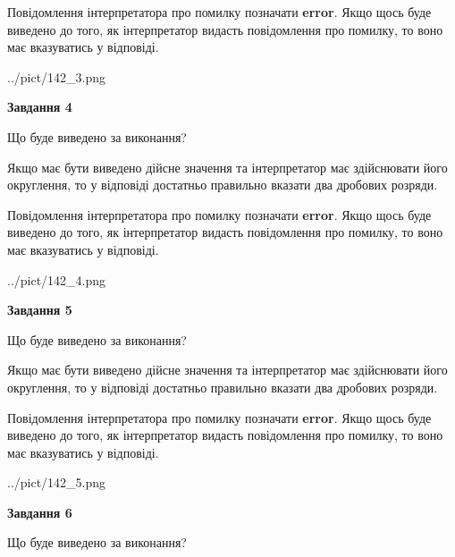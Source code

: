\documentclass[12pt, ukrainian]{article}
\begin{document}
{\begin {Large}
Повідомлення інтерпретатора про помилку позначати \textbf{error}.
Якщо щось буде виведено до того, як інтерпретатор видасть повідомлення про помилку, 
то воно має вказуватись у відповіді. \par

\begin{center}
	{../pict/142_3.png}
\end{center}
\newpage

{\begin {center}\textbf{Завдання 4}\end {center}}\par
Що буде виведено за виконання? \par

Якщо має бути виведено дійсне значення та інтерпретатор має здійснювати його округлення, 
то у відповіді достатньо правильно вказати два дробових розряди.

Повідомлення інтерпретатора про помилку позначати \textbf{error}.
Якщо щось буде виведено до того, як інтерпретатор видасть повідомлення про помилку, 
то воно має вказуватись у відповіді. \par

\begin{center}
	{../pict/142_4.png}
\end{center}
\newpage

{\begin {center}\textbf{Завдання 5}\end {center}}\par
Що буде виведено за виконання? \par

Якщо має бути виведено дійсне значення та інтерпретатор має здійснювати його округлення, 
то у відповіді достатньо правильно вказати два дробових розряди.

Повідомлення інтерпретатора про помилку позначати \textbf{error}.
Якщо щось буде виведено до того, як інтерпретатор видасть повідомлення про помилку, 
то воно має вказуватись у відповіді. \par

\begin{center}
	{../pict/142_5.png}
\end{center}
\newpage

{\begin {center}\textbf{Завдання 6}\end {center}}\par
Що буде виведено за виконання? \par


\end{Large}}
\end{document}
